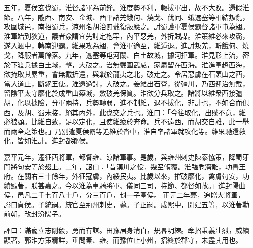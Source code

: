 \begin{pinyinscope}
 
 五年，夏侯玄伐蜀，淮督諸軍為前鋒。淮度勢不利，輙拔軍出，故不大敗。還假淮節。八年，隴西、南安、金城、西平諸羌餓何、燒戈、伐同、蛾遮塞等相結叛亂，攻圍城邑，南招蜀兵，涼州名胡治無戴復叛應之。討蜀護軍夏侯霸督諸軍屯為翅。淮軍始到狄道，議者僉謂宜先討定枹罕，內平惡羌，外折賊謀。淮策維必來攻霸，遂入渢中，轉南迎霸。維果攻為翅，會淮軍適至，維遁退。進討叛羌，斬餓何、燒戈，降服者萬餘落。九年，遮塞等屯河關、白土故城，據河拒軍。淮見形上流，密於下渡兵據白土城，擊，大破之。治無戴圍武威，家屬留在西海。淮進軍趨西海，欲掩取其累重，會無戴折還，與戰於龍夷之北，破走之。令居惡虜在石頭山之西，當大道止，斷絕王使。淮還過討，大破之。姜維出石營，從彊川，乃西迎治無戴，留陰平太守廖化於成重山築城，斂破羌保質。淮欲分兵取之。諸將以維衆西接彊胡，化以據險，分軍兩持，兵勢轉弱，進不制維，退不拔化，非計也，不如合而俱西，及胡、蜀未接，絕其內外，此伐交之兵也。淮曰：「今往取化，出賊不意，維必狼顧。比維自致，足以定化，且使維疲於奔命。兵不遠西，而胡交自離，此一舉而兩全之策也。」乃別遣夏侯霸等追維於沓中，淮自率諸軍就攻化等。維果馳還救化，皆如淮計。進封都鄉侯。
 
 
嘉平元年，遷征西將軍，都督雍、涼諸軍事。是歲，與雍州刺史陳泰恊策，降蜀牙門將句安等於翅上。二年，詔曰：「昔漢川之役，幾至傾覆。淮臨危濟難，功書王府。在關右三十餘年，外征寇虜，內綏民夷。比歲以來，摧破廖化，禽虜句安，功績顯著，朕甚嘉之。今以淮為車騎將軍、儀同三司，持節、都督如故。」進封陽曲侯，邑凡二千七百八十戶，分三百戶，封一子亭侯。
 正元二年薨，追贈大將軍，謚曰貞侯。子統嗣。統官至荊州刺史，薨。子正嗣。咸熈中，開建五等，以淮著勳前朝，改封汾陽子。
 
 
 
 
 評曰：滿寵立志剛毅，勇而有謀。田豫居身清白，規畧明練。牽招秉義壯烈，威績顯著。郭淮方策精詳，垂問秦、雍。而豫位止小州，招終於郡守，未盡其用也。
 
 
\end{pinyinscope}